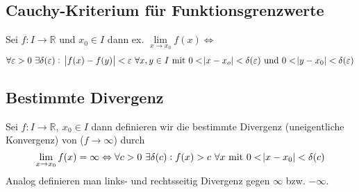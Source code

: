 \documentclass[10pt]{article}
\newcommand{\R}{\mathbb{R}}
\begin{document}
    \subsection{Cauchy-Kriterium für Funktionsgrenzwerte}
    Sei $f: I \rightarrow \R$ und $x_0 \in I$ dann ex.
    $\lim\limits_{x \rightarrow x_0} f(x) \Leftrightarrow$
    \begin{equation*}
        \forall \varepsilon > 0\ \exists \delta(\varepsilon):\
        \abs{f(x) - f(y)}<\varepsilon\ \forall x,y \in I \text{ mit }
        0 < \abs{x-x_o} < \delta(\varepsilon) \text{ und }
        0 < \abs{y-x_0} < \delta(\varepsilon)
    \end{equation*}

    \subsection{Bestimmte Divergenz}
    Sei $f: I \rightarrow \R ,\ x_0 \in I$ dann definieren wir die bestimmte
    Divergenz (uneigentliche Konvergenz) von ($f \rightarrow \infty$) durch
    \begin{equation*}
        \lim_{x \rightarrow x_0} f(x) = \infty \Leftrightarrow
        \forall c>0\ \exists \delta(c): f(x) > c\ \forall x \text{ mit }
        0 < \abs{x - x_0} < \delta(c)
    \end{equation*}
    Analog definieren man links- und rechtsseitig Divergenz gegen $\infty$ bzw.
    $-\infty$.
\end{document}
